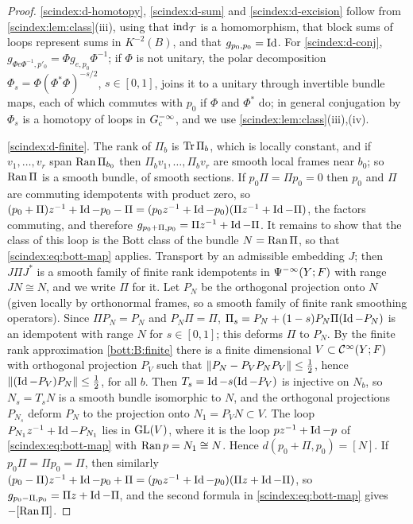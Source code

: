 \begin{proof}
  \ref{scindex:d-homotopy}, \ref{scindex:d-sum} and \ref{scindex:d-excision}
  follow from \cref{scindex:lem:class}(iii), using that $\operatorname{ind}_{\mathcal T}$ is a homomorphism,
  that block sums of loops represent sums in $K^{-2}(B)$, and that
  $g_{p_0,p_0}=\operatorname{Id}$. For \ref{scindex:d-conj}, $g_{\Phi e\Phi^{-1},p'_0}=\Phi
  g_{e,p_0}\Phi^{-1}$; if $\Phi$ is not unitary, the polar decomposition
  $\Phi_s=\Phi(\Phi^*\Phi)^{-s/2}$, $s\in[0,1]$, joins it to a unitary through
  invertible bundle maps, each of which commutes with $p_0$ if $\Phi$ and
  $\Phi^*$ do; in general conjugation by $\Phi_s$ is a homotopy of loops in
  $G^{-\infty}_{\mathrm c}$, and we use \cref{scindex:lem:class}(iii),(iv).

  \ref{scindex:d-finite}. The rank of $\Pi_b$ is $\operatorname{Tr}\Pi_b$, which is locally
  constant, and if $v_1,\dots,v_r$ span $\operatorname{Ran}\Pi_{b_0}$ then
  $\Pi_bv_1,\dots,\Pi_bv_r$ are smooth local frames near $b_0$; so $\operatorname{Ran}\Pi$ is a
  smooth bundle, of smooth sections. If $p_0\Pi=\Pi p_0=0$ then $p_0$ and $\Pi$
  are commuting idempotents with product zero, so
  $(p_0+\Pi)z^{-1}+\operatorname{Id}-p_0-\Pi=(p_0z^{-1}+\operatorname{Id}-p_0)(\Pi z^{-1}+\operatorname{Id}-\Pi)$, the
  factors commuting, and therefore $g_{p_0+\Pi,p_0}=\Pi z^{-1}+\operatorname{Id}-\Pi$. It
  remains to show that the class of this loop is the Bott class of the bundle
  $N=\operatorname{Ran}\Pi$, so that \eqref{scindex:eq:bott-map} applies. Transport by an
  admissible embedding $J$; then $J\Pi J^*$ is a smooth family of finite rank
  idempotents in $\Psi^{-\infty}(Y;F)$ with range $JN\cong N$, and we write
  $\Pi$ for it. Let $P_N$ be the orthogonal projection onto $N$ (given locally by
  orthonormal frames, so a smooth family of finite rank smoothing operators). Since
  $\Pi P_N=P_N$ and $P_N\Pi=\Pi$, $\Pi_s=P_N+(1-s)P_N\Pi(\operatorname{Id}-P_N)$ is an
  idempotent with range $N$ for $s\in[0,1]$; this deforms $\Pi$ to $P_N$. By the
  finite rank approximation \ref{bott:B:finite} there is a finite dimensional
  $V\subset\mathcal{C}^\infty(Y;F)$ with orthogonal projection $P_V$ such that
  $\lVert P_N-P_VP_NP_V\rVert\le\frac12$, hence $\lVert (\operatorname{Id}-P_V)P_N\rVert\le\frac12$, for
  all $b$. Then $T_s=\operatorname{Id}-s(\operatorname{Id}-P_V)$ is injective on $N_b$, so
  $N_s=T_sN$ is a smooth bundle isomorphic to $N$, and the orthogonal
  projections $P_{N_s}$ deform $P_N$ to the projection onto $N_1=P_VN\subset V$.
  The loop $P_{N_1}z^{-1}+\operatorname{Id}-P_{N_1}$ lies in $\operatorname{GL}(V)$, where it is the loop
  $pz^{-1}+\operatorname{Id}-p$ of \eqref{scindex:eq:bott-map} with $\operatorname{Ran} p=N_1\cong N$. Hence
  $d(p_0+\Pi,p_0)=[N]$. If $p_0\Pi=\Pi p_0=\Pi$, then similarly
  $(p_0-\Pi)z^{-1}+\operatorname{Id}-p_0+\Pi=(p_0z^{-1}+\operatorname{Id}-p_0)(\Pi z+\operatorname{Id}-\Pi)$, so
  $g_{p_0-\Pi,p_0}=\Pi z+\operatorname{Id}-\Pi$, and the second formula in
  \eqref{scindex:eq:bott-map} gives $-[\operatorname{Ran}\Pi]$.


\end{proof}
